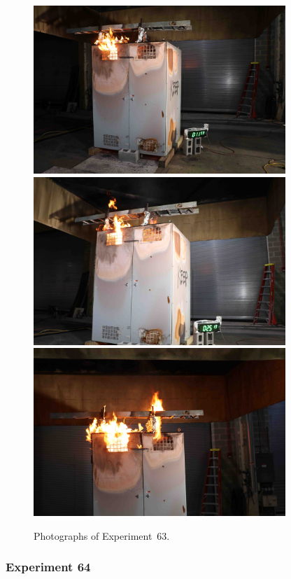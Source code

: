 \begin{figure}[p]
\centering
\includegraphics[height=2.50in]{../FIGURES/Test_63_11_min_59_s} \\
\includegraphics[height=2.50in]{../FIGURES/Test_63_25_min_13_s} \\
\includegraphics[height=2.50in]{../FIGURES/Test_63_ignition}
\caption[Photographs of Experiment~63]{Photographs of Experiment~63.}
\label{fig:Test_63_photos}
\end{figure}


\clearpage

\subsubsection{Experiment 64}

